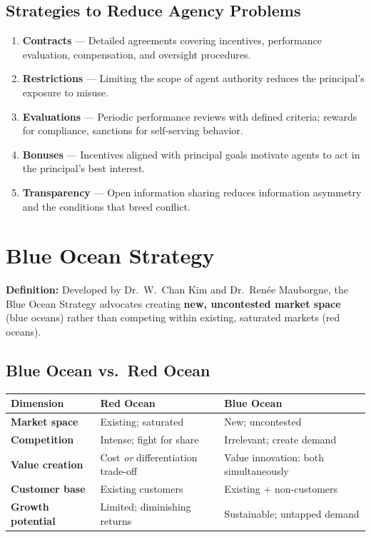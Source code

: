 \documentclass[11pt, letterpaper]{article}
\begin{document}
\subsection{Strategies to Reduce Agency Problems}

\begin{enumerate}[leftmargin=*, label=\textbf{\arabic*.}]
  \item \textbf{Contracts} --- Detailed agreements covering incentives, performance evaluation, compensation, and oversight procedures.
  \item \textbf{Restrictions} --- Limiting the scope of agent authority reduces the principal's exposure to misuse.
  \item \textbf{Evaluations} --- Periodic performance reviews with defined criteria; rewards for compliance, sanctions for self-serving behavior.
  \item \textbf{Bonuses} --- Incentives aligned with principal goals motivate agents to act in the principal's best interest.
  \item \textbf{Transparency} --- Open information sharing reduces information asymmetry and the conditions that breed conflict.
\end{enumerate}

\newpage

\section{Blue Ocean Strategy}

\begin{defbox}
\textbf{Definition:} Developed by Dr.\ W.\ Chan Kim and Dr.\ Renée Mauborgne, the Blue Ocean Strategy advocates creating \textbf{new, uncontested market space} (blue oceans) rather than competing within existing, saturated markets (red oceans).
\end{defbox}

\subsection{Blue Ocean vs.\ Red Ocean}

\begin{center}
\begin{tabular}{>{\bfseries}p{2.8cm} p{5.5cm} p{5.5cm}}
\toprule
Dimension & Red Ocean & Blue Ocean \\
\midrule
Market space & Existing; saturated & New; uncontested \\
Competition & Intense; fight for share & Irrelevant; create demand \\
Value creation & Cost \textit{or} differentiation trade-off & Value innovation: both simultaneously \\
Customer base & Existing customers & Existing + non-customers \\
Growth potential & Limited; diminishing returns & Sustainable; untapped demand \\
\bottomrule
\end{tabular}
\end{center}
\end{document}
